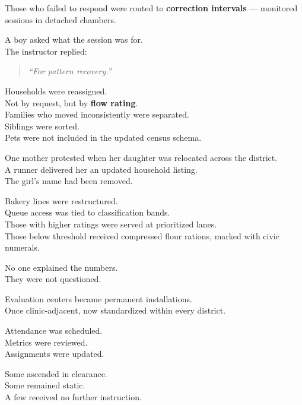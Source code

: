 \documentclass[9pt]{article}
\begin{document}
Those who failed to respond were routed to \textbf{correction intervals} — monitored sessions in detached chambers.

A boy asked what the session was for.\\
The instructor replied:

\begin{quote}
\textit{“For pattern recovery.”}
\end{quote}

\vspace{1em}

Households were reassigned.\\
Not by request, but by \textbf{flow rating}.\\
Families who moved inconsistently were separated.\\
Siblings were sorted.\\
Pets were not included in the updated census schema.

One mother protested when her daughter was relocated across the district.\\
A runner delivered her an updated household listing.\\
The girl’s name had been removed.

\vspace{1em}

Bakery lines were restructured.\\
Queue access was tied to classification bands.\\
Those with higher ratings were served at prioritized lanes.\\
Those below threshold received compressed flour rations, marked with civic numerals.

No one explained the numbers.\\
They were not questioned.

\vspace{1em}

Evaluation centers became permanent installations.\\
Once clinic-adjacent, now standardized within every district.

Attendance was scheduled.\\
Metrics were reviewed.\\
Assignments were updated.

Some ascended in clearance.\\
Some remained static.\\
A few received no further instruction.

\vspace{1em}
\end{document}
